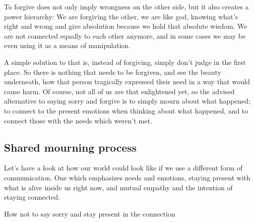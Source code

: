 To forgive does not only imply wrongness on the other side, but it also creates a power hierarchy:
We are forgiving the other, we are like god, knowing what's right and wrong and give absolution because we hold that absolute wisdom.
We are not connected equally to each other anymore, and in some cases we may be even using it as a means of manipulation.

A simple solution to that is, instead of forgiving, simply don't judge in the first place.
So there is nothing that needs to be forgiven, and see the beauty underneath, how that person tragically expressed their need in a way that would cause harm.
Of course, not all of us are that enlightened yet, so the advised alternative to saying sorry and forgive is to simply mourn about what happened; to connect to the present emotions when thinking about what happened, and to connect those with the needs which weren't met.

\subsection{Shared mourning process}\label{subsec:shared-mourning-process}

Let's have a look at how our world could look like if we use a different form of communication.
One which emphasizes needs and emotions, staying present with what is alive inside us right now, and mutual empathy and the intention of staying connected.

\begin{example}{How not to say sorry and stay present in the connection}
\end{example}


